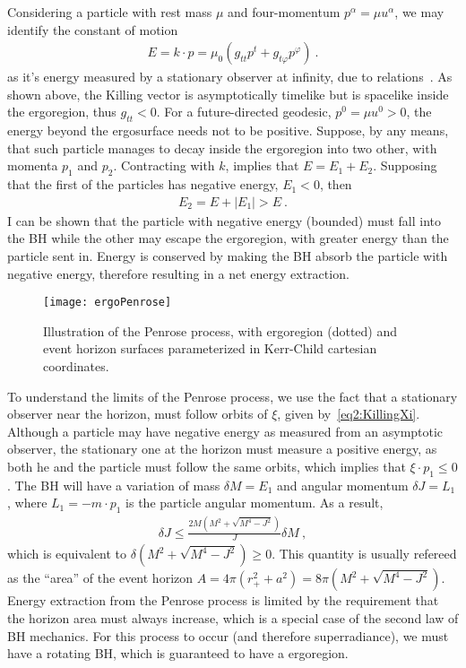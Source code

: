 Considering a particle with rest mass $\mu$ and four-momentum $p^\alpha = \mu u^\alpha$, we may identify the constant of motion 
\begin{align}
    E = k \cdot p = \mu_0 ( g_{tt} p^t + g_{t\varphi} p^\varphi ) ~.
    \label{eq2:PenroseE0}
\end{align}
as it's energy measured by a stationary observer at infinity, due to relations~. As shown above, the Killing vector is asymptotically timelike but is spacelike inside the ergoregion, thus $g_{tt}<0$. For a future-directed geodesic, $p^0 = \mu u^0 > 0$, the energy beyond the ergosurface needs not to be positive. Suppose, by any means, that such particle manages to decay inside the ergoregion into two other, with momenta $p_1$ and $p_2$. Contracting with $k$, implies that $E = E_1+E_2$. Supposing that the first of the particles has negative energy, $E_1<0$, then 
\begin{align}
    E_2 = E + |E_1| > E ~.
    \label{eq2:PenroseE2}
\end{align}
I can be shown that the particle with negative energy (bounded) must fall into the BH while the other may escape the ergoregion, with greater energy than the particle sent in. Energy is conserved by making the BH absorb the particle with negative energy, therefore resulting in a net energy extraction.

\begin{figure}[h]
    \centering
    \vspace{0.5cm}
    \texttt{[image: ergoPenrose]}
    \caption{Illustration of the Penrose process, with ergoregion (dotted) and event horizon surfaces parameterized in Kerr-Child cartesian coordinates.}
    \label{fig2:penroseProcess}
\end{figure}

To understand the limits of the Penrose process, we use the fact that a stationary observer near the horizon, must follow orbits of $\xi$, given by~\eqref{eq2:KillingXi}. 
Although a particle may have negative energy as measured from an asymptotic observer, the stationary one at the horizon must measure a positive energy, as both he and the particle must follow the same orbits, which implies that $\xi \cdot  p_1 \le 0$. The BH will have a variation of mass $\delta M =E_1$ and angular momentum $\delta J = L_1$, where $L_1 = -m \cdot p_1$ is the particle angular momentum. As a result,
\begin{align}
    \delta J \le \frac{2M\left(M^2+\sqrt{M^4-J^2}\right)}{J} \delta M ~,
\end{align}
which is equivalent to $\delta \left(M^2+\sqrt{M^4-J^2}\right) \ge 0$. This quantity is usually refereed as the ``area'' of the event horizon $A=4\pi(r_+^2+a^2)=8\pi\left(M^2+\sqrt{M^4-J^2}\right)$. Energy extraction from the Penrose process is limited by the requirement that the horizon area must always increase, which is a special case of the second law of BH mechanics. For this process to occur (and therefore superradiance), we must have a rotating BH, which is guaranteed to have a ergoregion.

